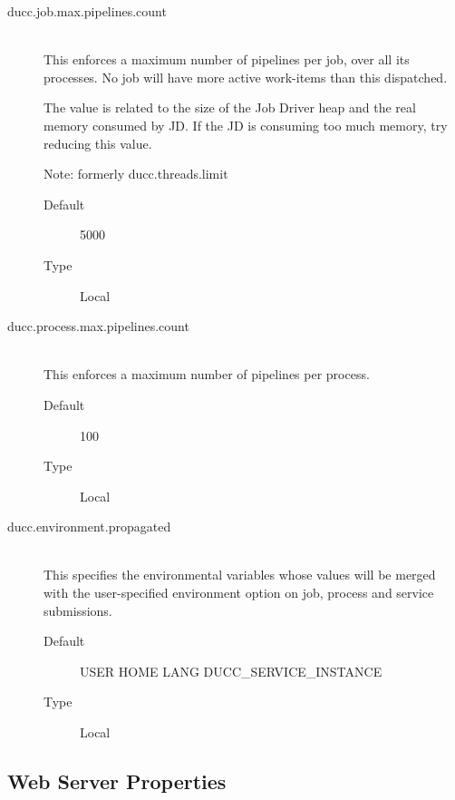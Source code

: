 \begin{description}
       \item[ducc.job.max.pipelines.count] \hfill \\
         This enforces a maximum number of pipelines per job, over all its processes. No 
         job will have more active work-items than this dispatched.

         The value is related to the size of the Job Driver heap and the real memory consumed by JD.
         If the JD is consuming too much memory, try reducing this value.
         
         Note: formerly ducc.threads.limit
         
         \begin{description}
           \item[Default] 5000 
           \item[Type] Local 
         \end{description}

      \item[ducc.process.max.pipelines.count] \hfill \\
         This enforces a maximum number of pipelines per process.

         \begin{description}
           \item[Default] 100
           \item[Type] Local 
         \end{description}


       \item[ducc.environment.propagated] \hfill \\
         This specifies the environmental variables whose values will be merged with the
         user-specified environment option on job, process and service submissions.

         \begin{description}
           \item[Default] USER HOME LANG DUCC\_SERVICE\_INSTANCE
           \item[Type] Local 
         \end{description}
                                                                        
      \end{description}  
        

\subsection{Web Server Properties}

